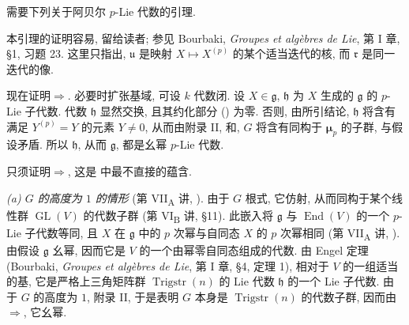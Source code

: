 需要下列关于阿贝尔 \(p\)-Lie 代数的引理.


本引理的证明容易, 留给读者; 参见 Bourbaki, \emph{Groupes et algèbres de Lie},
第 I 章, \S1, 习题 23. 这里只指出, \(\mathfrak u\) 是映射 \(X\mapsto X^{(p)}\)
的某个适当迭代的核, 而 \(\mathfrak r\) 是同一迭代的像.

现在证明\(\Rightarrow\).
必要时扩张基域, 可设 \(k\) 代数闭.
设 \(X\in\mathfrak g\), \(\mathfrak h\) 为 \(X\) 生成的 \(\mathfrak g\) 的 \(p\)-Lie 子代数.
代数 \(\mathfrak h\) 显然交换, 且其约化部分
() 为零.
否则, 由所引结论, \(\mathfrak h\) 将含有满足 \(Y^{(p)}=Y\) 的元素 \(Y\ne0\),
从而由附录 II,  和,
\(G\) 将含有同构于 \(\boldsymbol\mu_p\) 的子群, 与假设矛盾.
所以 \(\mathfrak h\), 从而 \(\mathfrak g\), 都是幺幂 \(p\)-Lie 代数.

只须证明\(\Rightarrow\),
这是 中最不直接的蕴含.

\medskip\noindent\textit{(a) \(G\) 的高度为 \(1\) 的情形}
(第 VII\textsubscript{A} 讲, ).
由于 \(G\) 根式, 它仿射, 从而同构于某个线性群 \(\operatorname{GL}(V)\) 的代数子群
(第 VI\textsubscript{B} 讲, \S11). 此嵌入将 \(\mathfrak g\) 与
\(\operatorname{End}(V)\) 的一个 \(p\)-Lie 子代数等同,
且 \(X\) 在 \(\mathfrak g\) 中的 \(p\) 次幂与自同态 \(X\) 的 \(p\) 次幂相同
(第 VII\textsubscript{A} 讲, ).
由假设 \(\mathfrak g\) 幺幂, 因而它是 \(V\) 的一个由幂零自同态组成的代数.
由 Engel 定理 (Bourbaki, \emph{Groupes et algèbres de Lie}, 第 I 章, \S4, 定理 1),
相对于 \(V\) 的一组适当的基, 它是严格上三角矩阵群 \(\operatorname{Trigstr}(n)\)
的 Lie 代数 \(\mathfrak h\) 的一个 Lie 子代数.
由于 \(G\) 的高度为 \(1\), 附录 II, 
于是表明 \(G\) 本身是 \(\operatorname{Trigstr}(n)\) 的代数子群,
因而由\(\Rightarrow\),
它幺幂.

